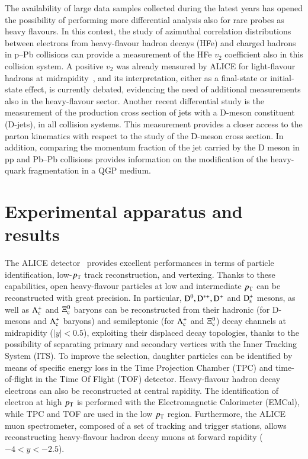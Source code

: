 \documentclass{webofc}
\newcommand{\pt}{p_{\rm T}}
\newcommand{\Dzero}{{\rm D^0}}
\newcommand{\Dstar}{{\rm D^{*+}}}
\newcommand{\Dplus}{{\rm D^+}}
\newcommand{\Ds}{{\rm D}^+_{\rm s}}
\begin{document}
The availability of large data samples collected during the latest years has opened the possibility of performing more differential analysis also for rare probes as heavy flavours.
In this contest, the study of azimuthal correlation distributions between electrons from heavy-flavour hadron decays (HFe) and charged hadrons in p--Pb collisions can provide a measurement of the HFe $v_2$ coefficient also in this collision system. A positive $v_2$ was already measured by ALICE for light-flavour hadrons at midrapidity~\cite{Abelev:2012ola}, and its interpretation, either as a final-state or initial-state effect, is currently debated, evidencing the need of additional measurements also in the heavy-flavour sector.
Another recent differential study is the measurement of the production cross section of jets with a D-meson constituent (D-jets), in all collision systems. This measurement provides a closer access to the parton kinematics with respect to the study of the D-meson cross section. In addition, comparing the momentum fraction of the jet carried by the D meson in pp and Pb--Pb collisions provides information on the modification of the heavy-quark fragmentation in a QGP medium.

\section{Experimental apparatus and results}
\label{sec-main}
The ALICE detector~\cite{Aamodt:2008zz,Abelev:2014ffa} provides excellent performances in terms of particle identification, low-$\pt$ track reconstruction, and vertexing. Thanks to these capabilities, open heavy-flavour particles at low and intermediate $\pt$ can be reconstructed with great precision.
In particular, $\Dzero, \Dstar, \Dplus$ and $\Ds$ mesons, as well as $\Lambda^+_{\rm c}$ and $\Xi^0_{\rm c}$ baryons can be reconstructed from their hadronic (for D-mesons and $\Lambda^+_{\rm c}$ baryons) and semileptonic (for $\Lambda^+_{\rm c}$ and $\Xi^0_{\rm c}$) decay channels at midrapidity ($|y|<0.5$), exploiting their displaced decay topologies, thanks to the possibility of separating primary and secondary vertices with the Inner Tracking System (ITS). To improve the selection, daughter particles can be identified
by means of specific energy loss in the Time Projection Chamber (TPC) and time-of-flight in the Time Of Flight (TOF) detector.
Heavy-flavour hadron decay electrons can also be reconstructed at central rapidity. The identification of electron at high $\pt$ is performed with the Electromagnetic Calorimeter (EMCal), while TPC and TOF are used in the low $\pt$ region.
Furthermore, the ALICE muon spectrometer, composed of a set of tracking and trigger stations, allows reconstructing heavy-flavour hadron decay muons at forward rapidity ($-4 < y < -2.5$).
\end{document}
